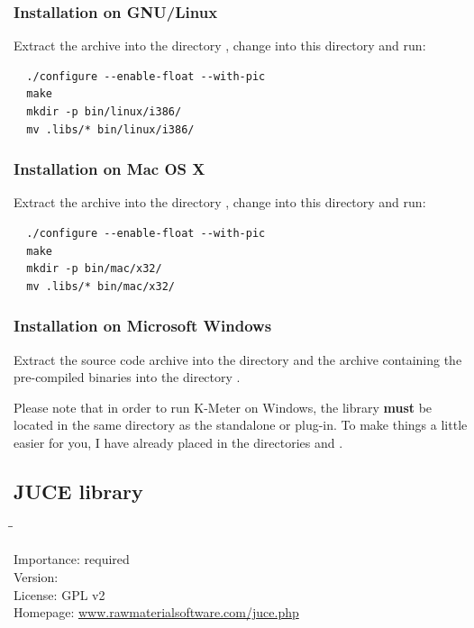 \subsubsection{Installation on GNU/Linux}

Extract the archive into the directory , change
into this directory and run:

\begin{verbatim}
  ./configure --enable-float --with-pic
  make
  mkdir -p bin/linux/i386/
  mv .libs/* bin/linux/i386/
\end{verbatim}

\subsubsection{Installation on Mac OS X}

Extract the archive into the directory , change
into this directory and run:

\begin{verbatim}
  ./configure --enable-float --with-pic
  make
  mkdir -p bin/mac/x32/
  mv .libs/* bin/mac/x32/
\end{verbatim}

\subsubsection{Installation on Microsoft Windows}

Extract the source code archive into the directory
 and the archive containing the pre-compiled
binaries into the directory .

Please note that in order to run K-Meter on Windows, the library
 \textbf{must} be located in the same directory
as the standalone or plug-in.  To make things a little easier for you,
I have already placed  in the directories
 and .

\subsection{JUCE library}

\begin{tabbing}
  \hspace*{6em}\=\=\kill

  Importance:  \> required \\
  Version:      \\
  License:     \> GPL v2 \\
  Homepage:    \> \href{http://www.rawmaterialsoftware.com/juce.php}{www.rawmaterialsoftware.com/juce.php}
\end{tabbing}

